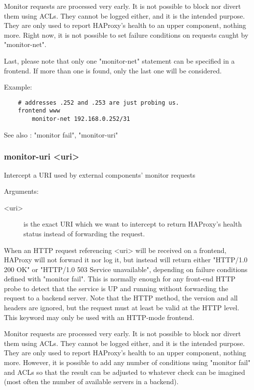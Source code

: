   Monitor requests are processed very early. It is not possible to block nor
  divert them using ACLs. They cannot be logged either, and it is the intended
  purpose. They are only used to report HAProxy's health to an upper component,
  nothing more. Right now, it is not possible to set failure conditions on
  requests caught by "monitor-net".

  Last, please note that only one "monitor-net" statement can be specified in
  a frontend. If more than one is found, only the last one will be considered.

  Example:
\begin{verbatim}
    # addresses .252 and .253 are just probing us.
    frontend www
        monitor-net 192.168.0.252/31
\end{verbatim}

  See also : "monitor fail", "monitor-uri"

\subsubsection[monitor-uri]{monitor-uri <uri>}
  Intercept a URI used by external components' monitor requests


  Arguments:
\begin{description}
\item[<uri>]     is the exact URI which we want to intercept to return HAProxy's
              health status instead of forwarding the request.
\end{description}

  When an HTTP request referencing <uri> will be received on a frontend,
  HAProxy will not forward it nor log it, but instead will return either
  "HTTP/1.0 200 OK" or "HTTP/1.0 503 Service unavailable", depending on failure
  conditions defined with "monitor fail". This is normally enough for any
  front-end HTTP probe to detect that the service is UP and running without
  forwarding the request to a backend server. Note that the HTTP method, the
  version and all headers are ignored, but the request must at least be valid
  at the HTTP level. This keyword may only be used with an HTTP-mode frontend.

  Monitor requests are processed very early. It is not possible to block nor
  divert them using ACLs. They cannot be logged either, and it is the intended
  purpose. They are only used to report HAProxy's health to an upper component,
  nothing more. However, it is possible to add any number of conditions using
  "monitor fail" and ACLs so that the result can be adjusted to whatever check
  can be imagined (most often the number of available servers in a backend).

